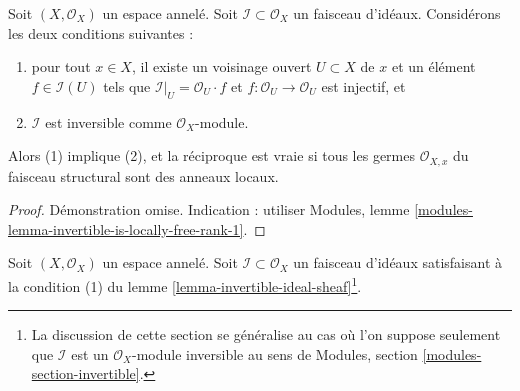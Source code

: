 \begin{lemma}

\label{lemma-invertible-ideal-sheaf}

Soit $(X, \mathcal{O}_X)$ un espace annelé.
Soit $\mathcal{I} \subset \mathcal{O}_X$ un faisceau d'idéaux. Considérons les deux conditions suivantes :

\begin{enumerate}

\item pour tout $x \in X$, il existe un voisinage ouvert
$U \subset X$ de $x$ et un élément $f \in \mathcal{I}(U)$ tels que
$\mathcal{I}|_U = \mathcal{O}_U \cdot f$ et
$f : \mathcal{O}_U \to \mathcal{O}_U$ est injectif, et
\item  $\mathcal{I}$ est inversible comme $\mathcal{O}_X$-module.

\end{enumerate}

Alors (1) implique (2), et la réciproque est vraie si tous les germes
$\mathcal{O}_{X, x}$ du faisceau structural sont des anneaux locaux.

\end{lemma}

\begin{proof}
Démonstration omise. Indication : utiliser Modules, lemme \ref{modules-lemma-invertible-is-locally-free-rank-1}.
\end{proof}

\begin{situation}

\label{situation-eta}
Soit $(X, \mathcal{O}_X)$ un espace annelé. Soit $\mathcal{I} \subset \mathcal{O}_X$ un faisceau d'idéaux satisfaisant à la condition (1) du lemme \ref{lemma-invertible-ideal-sheaf}\footnote{La discussion de cette section se généralise au cas où l'on suppose seulement que $\mathcal{I}$ est un $\mathcal{O}_X$-module inversible au sens de Modules, section \ref{modules-section-invertible}.}.
\end{situation}


